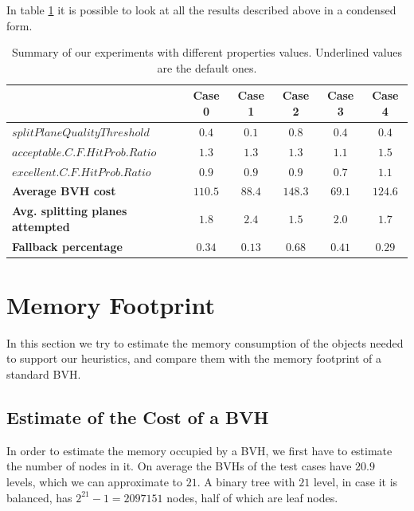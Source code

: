 \documentclass{PoliMi_MasterThesis}
\begin{document}
In table \ref{tab:different_properties_summary} it is possible to look at all the results described above in a condensed form.

\begin{table}[H]
    \centering
    \begin{tabular}{|l|c|c|c|c|c|}
		\hline
		& \textbf{Case 0} & \textbf{Case 1} & \textbf{Case 2} & \textbf{Case 3} & \textbf{Case 4}\\ 
		\hline \hline
        \boldmath$splitPlaneQualityThreshold$ & \underline{$0.4$} & $0.1$ & $0.8$ & \underline{$0.4$} & \underline{$0.4$}\\
		\boldmath$acceptable.C.F.HitProb.Ratio$ & \underline{$1.3$} & \underline{$1.3$} & \underline{$1.3$} & $1.1$ & $1.5$\\
		\boldmath$excellent.C.F.HitProb.Ratio$ & \underline{$0.9$} & \underline{$0.9$} & \underline{$0.9$} & $0.7$ & $1.1$\\
		\hline
		\textbf{Average BVH cost} & $110.5$ & $88.4$ & $148.3$ & $69.1$ & $124.6$\\
		\textbf{Avg. splitting planes attempted} & $1.8$ & $2.4$ & $1.5$ & $2.0$ & $1.7$\\
		\textbf{Fallback percentage} & $0.34$ & $0.13$ & $0.68$ & $0.41$ & $0.29$\\
		\hline
    \end{tabular}
	\caption{Summary of our experiments with different properties values. Underlined values are the default ones.}
	\label{tab:different_properties_summary}
\end{table}

\section{Memory Footprint} \label{sec:memory_footprint}
In this section we try to estimate the memory consumption of the objects needed to support our heuristics, and compare them with the memory footprint of a standard BVH.

\subsection*{Estimate of the Cost of a BVH}
In order to estimate the memory occupied by a BVH, we first have to estimate the number of nodes in it. On average the BVHs of the test cases have $20.9$ levels, which we can approximate to $21$. A binary tree with $21$ level, in case it is balanced, has $2^{21}-1 = 2097151$ nodes, half of which are leaf nodes.
\end{document}
